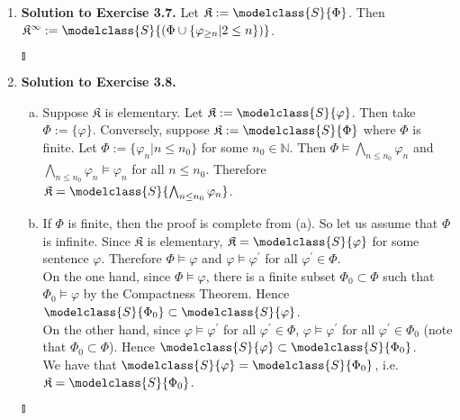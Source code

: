 \begin{enumerate}[1.]
\item \textbf{Solution to Exercise 3.7.} Let $\mathfrak{K} := \modelclass{S}{\Phi}$. Then $\mathfrak{K}^\infty := \modelclass{S}{(\Phi \cup \{\varphi_{\geq n} | 2 \leq n \})}$. \begin{flushright}$\talloblong$\end{flushright}
%
\item \textbf{Solution to Exercise 3.8.}
\begin{enumerate}[(a)]
\item Suppose $\mathfrak{K}$ is elementary. Let $\mathfrak{K} := \modelclass{S}{\varphi}$. Then take $\Phi := \{ \varphi \}$. Conversely, suppose $\mathfrak{K} := \modelclass{S}{\Phi}$ where $\Phi$ is finite. Let $\Phi := \{ \varphi_n | n \leq n_0 \}$ for some $n_0 \in \mathbb{N}$. Then $\Phi \models \bigwedge_{n \leq n_0} \varphi_n$ and $\bigwedge_{n \leq n_0} \varphi_n \models \varphi_n$ for all $n \leq n_0$. Therefore $\mathfrak{K} = \modelclass{S}{\bigwedge_{n \leq n_0} \varphi_n}$.
\item If $\Phi$ is finite, then the proof is complete from (a). So let us assume that $\Phi$ is infinite. Since $\mathfrak{K}$ is elementary, $\mathfrak{K} = \modelclass{S}{\varphi}$ for some sentence $\varphi$. Therefore $\Phi \models \varphi$ and $\varphi \models \varphi^\prime$ for all $\varphi^\prime \in \Phi$.\\
On the one hand, since $\Phi \models \varphi$, there is a finite subset $\Phi_0 \subset \Phi$ such that $\Phi_0 \models \varphi$ by the Compactness Theorem. Hence $\modelclass{S}{\Phi_0} \subset \modelclass{S}{\varphi}$.\\
On the other hand, since $\varphi \models \varphi^\prime$ for all $\varphi^\prime \in \Phi$, $\varphi \models \varphi^\prime$ for all $\varphi^\prime \in \Phi_0$ (note that $\Phi_0 \subset \Phi$). Hence $\modelclass{S}{\varphi} \subset \modelclass{S}{\Phi_0}$.\\
We have that $\modelclass{S}{\varphi} = \modelclass{S}{\Phi_0}$, i.e. $\mathfrak{K} = \modelclass{S}{\Phi_0}$.
\end{enumerate} \begin{flushright}$\talloblong$\end{flushright}

\end{enumerate}
